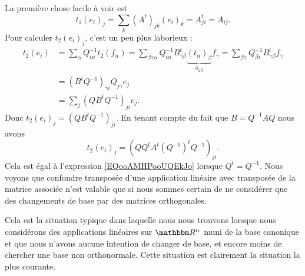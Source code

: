 La première chose facile à voir est
\begin{equation}        \label{EQooAMHPooUQEkJo}
    t_1(e_i)_j=\sum_k(A^t)_{jk}(e_i)_k=A^t_{ji}=A_{ij}.
\end{equation}
Pour calculer \( t_2(e_i)_j\), c'est un peu plus laborieux :
\begin{subequations}
    \begin{align}
        t_2(e_i)&=\sum_{\alpha}Q_{\alpha i}^{-1} t_2(f_\alpha)=\sum_{\beta\gamma\alpha}Q_{\alpha i}^{-1}B^t_{\gamma\beta}\underbrace{(t_{\alpha})_{\beta}}_{\delta_{\alpha\beta}}f_{\gamma}=\sum_{\beta\gamma}Q_{\beta i}^{-1}B^t_{\gamma\beta}f_{\gamma}\\
        &=(B^tQ^{-1})_{\gamma i}Q_{j\gamma}e_j\\
        &=\sum_j(QB^tQ^{-1})_{ji}e_j.
    \end{align}
\end{subequations}
Donc \( t_2(e_i)_j=(QB^tQ^{-1})_{ji}\). En tenant compte du fait que \( B=Q^{-1}AQ\) nous avons
\begin{equation}
    t_2(e_i)_j=(QQ^tA^t(Q^{-1})^tQ^{-1})_{ji}.
\end{equation}
Cela est égal à l'expression \eqref{EQooAMHPooUQEkJo} lorsque \( Q^t=Q^{-1}\). Nous voyons que confondre transposée d'une application linéaire avec transposée de la matrice associée n'est valable que si nous sommes certain de ne considérer que des changements de base par des matrices orthogonales.

Cela est la situation typique dans laquelle nous nous trouvons lorsque nous considérons des applications linéaires sur \( \eR^n\) muni de la base canonique et que nous n'avons aucune intention de changer de base, et encore moins de chercher une base non orthonormale. Cette situation est clairement la situation la plus courante.


